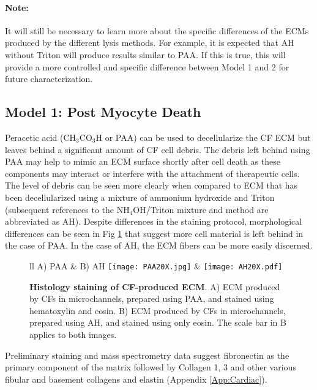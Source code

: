 \paragraph{\textbf{Note}:} It will still be necessary to learn more about the specific differences of the ECMs produced by the different lysis methods. For example, it is expected that AH without Triton will produce results similar to PAA. If this is true, this will provide a more controlled and specific difference between Model 1 and 2 for future characterization.

\subsection{Model 1: Post Myocyte Death}
Peracetic acid (CH$_{3}$CO$_{3}$H or PAA) can be used to decellularize the CF ECM but leaves behind a significant amount of CF cell debris. The debris left behind using PAA may help to mimic an ECM surface shortly after cell death as these components may interact or interfere with the attachment of therapeutic cells. The level of debris can be seen more clearly when compared to ECM that has been decellularized using a mixture of ammonium hydroxide and Triton (subsequent references to the NH$_{4}$OH\slash Triton mixture and method are abbreviated as AH). Despite differences in the staining protocol, morphological differences can be seen in Fig \ref{Chap:Cardiac:fig:ecmEosin} that suggest more cell material is left behind in the case of PAA. In the case of AH, the ECM fibers can be more easily discerned. 

\begin{figure}[!ht]
\centering
\begin{tabular}{ll}
A) PAA & B) AH \cr
\texttt{[image: PAA20X.jpg]} & 
\texttt{[image: AH20X.pdf]} \cr
\end{tabular}
\caption{\textbf{Histology staining of CF-produced ECM}. A) ECM produced by CFs in microchannels, prepared using PAA, and stained using hematoxylin and eosin. B) ECM produced by CFs in microchannels, prepared using AH, and stained using only eosin. The scale bar in B applies to both images.}
\label{Chap:Cardiac:fig:ecmEosin}
\end{figure}

Preliminary staining and mass spectrometry data suggest fibronectin as the primary component of the matrix followed by Collagen 1, 3 and other various fibular and basement collagens and elastin (Appendix \ref{App:Cardiac}).

